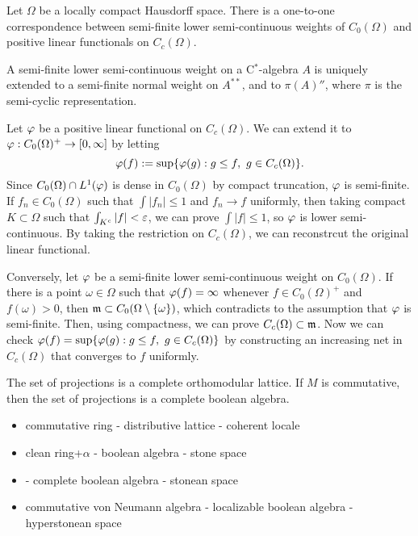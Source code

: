 \documentclass{../../large}
\begin{document}
\begin{prb}
Let $\Omega$ be a locally compact Hausdorff space.
There is a one-to-one correspondence between semi-finite lower semi-continuous weights of $C_0(\Omega)$ and positive linear functionals on $C_c(\Omega)$.

A semi-finite lower semi-continuous weight on a C$^*$-algebra $A$ is uniquely extended to a semi-finite normal weight on $A^{**}$, and to $\pi(A)''$, where $\pi$ is the semi-cyclic representation.
\end{prb}
\begin{pf}
Let $\varphi$ be a positive linear functional on $C_c(\Omega)$.
We can extend it to $\varphi:C_0(\Omega)^+\to[0,\infty]$ by letting
\[\varphi(f):=\sup\{\varphi(g):g\le f,\ g\in C_c(\Omega)\}.\]
Since $C_0(\Omega)\cap L^1(\varphi)$ is dense in $C_0(\Omega)$ by compact truncation, $\varphi$ is semi-finite.
If $f_n\in C_0(\Omega)$ such that $\int|f_n|\le1$ and $f_n\to f$ uniformly, then taking compact $K\subset\Omega$ such that $\int_{K^c}|f|<\varepsilon$, we can prove $\int|f|\le1$, so $\varphi$ is lower semi-continuous.
By taking the restriction on $C_c(\Omega)$, we can reconstrcut the original linear functional.

Conversely, let $\varphi$ be a semi-finite lower semi-continuous weight on $C_0(\Omega)$.
If there is a point $\omega\in\Omega$ such that $\varphi(f)=\infty$ whenever $f\in C_0(\Omega)^+$ and $f(\omega)>0$, then $\mathfrak{m}\subset C_0(\Omega\setminus\{\omega\})$, which contradicts to the assumption that $\varphi$ is semi-finite.
Then, using compactness, we can prove $C_c(\Omega)\subset\mathfrak{m}$.
Now we can check $\varphi(f)=\sup\{\varphi(g):g\le f,\ g\in C_c(\Omega)\}$ by constructing an increasing net in $C_c(\Omega)$ that converges to $f$ uniformly.
\end{pf}




\begin{prb}
The set of projections is a complete orthomodular lattice.
If $M$ is commutative, then the set of projections is a complete boolean algebra.
\end{prb}

\begin{itemize}
\item commutative ring - distributive lattice - coherent locale
\item clean ring+$\alpha$ - boolean algebra - stone space
\item - complete boolean algebra - stonean space
\item commutative von Neumann algebra - localizable boolean algebra - hyperstonean space
\end{itemize}
\end{document}

